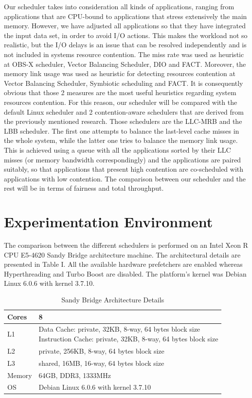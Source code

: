 \documentclass[diploma]{Styles/softlab-thesis}
\begin{document}
Our scheduler takes into consideration all kinds of applications, ranging from applications that are CPU-bound to applications that stress extensively the main memory. However, we have adjusted all applications so that they have integrated the input data set, in order to avoid I/O actions. This makes the workload not so realistic, but the I/O delays is an issue that can be resolved independently and is not included in systems resource contention. The miss rate was used as heuristic at OBS-X scheduler, Vector Balancing Scheduler, DIO and FACT. Moreover, the memory link usage was used as heuristic for detecting resources contention at Vector Balancing Scheduler, Symbiotic scheduling and FACT. It is consequently obvious that those 2 measures are the most useful heuristics regarding system resources contention. For this reason, our scheduler will be compared with the default Linux scheduler and 2 contention-aware schedulers that are derived from the previously mentioned research. Those schedulers are the LLC-MRB and the LBB scheduler. The first one attempts to balance the last-level cache misses in the whole system, while the latter one tries to balance the memory link usage. This is achieved using a queue with all the applications sorted by their LLC misses (or memory bandwidth correspondingly) and the applications are paired suitably, so that applications that present high contention are co-scheduled with applications with low contention. The comparison between our scheduler and the rest will be in terms of fairness and total throughput. 

\section{Experimentation Environment}

The comparison between the different schedulers is performed on an Intel Xeon R CPU E5-4620 Sandy Bridge architecture machine. The architectural details are presented in Table I. All the available hardware prefetchers are enabled whereas Hyperthreading and Turbo Boost are disabled. The platform's kernel was Debian Linux 6.0.6 with kernel 3.7.10.

\begin{table}[h]
\begin{center}
\caption{Sandy Bridge Architecture Details}
\begin{tabular}{ | l | l | }
    \hline
    Cores & 8 \\ \hline
    L1 & \makecell{Data Cache: private, 32KB, 8-way, 64 bytes block size \\ Instruction Cache: private, 32KB, 8-way, 64 bytes block size} \\ \hline
    L2 & private, 256KB, 8-way, 64 bytes block size \\ \hline
    L3 & shared, 16MB, 16-way, 64 bytes block size  \\ \hline
    Memory &  64GB, DDR3, 1333MHz \\ \hline
    OS & Debian Linux 6.0.6 with kernel 3.7.10 \\ \hline
\end{tabular}
\end{center}
\end{table}
\end{document}
